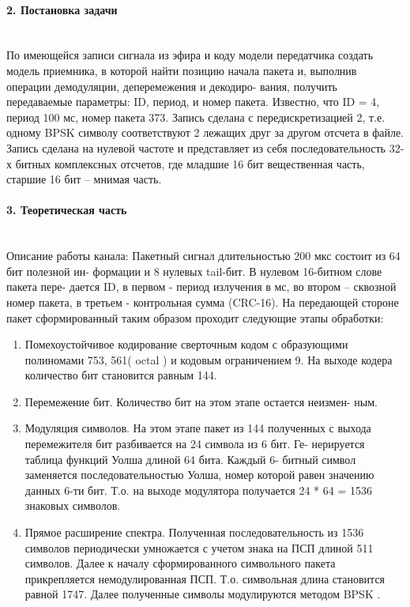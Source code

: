 \documentclass[12pt,a4paper]{report}
\begin{document}
\paragraph{2. Постановка задачи\\\\}
По имеющейся записи сигнала из эфира и коду модели передатчика создать модель приемника, в которой найти позицию начала
пакета и, выполнив операции демодуляции, деперемежения и декодиро-
вания, получить передаваемые параметры: ID, период, и номер пакета.
Известно, что ID = 4, период 100 мс, номер пакета 373. Запись сделана с передискретизацией 2, т.е. одному BPSK символу соответствуют 2 лежащих друг за другом отсчета в файле. Запись сделана на нулевой частоте и представляет из себя последовательность 32-х битных комплексных отсчетов, где младшие 16 бит вещественная часть, старшие 16 бит – мнимая часть.

\paragraph{3. Теоретическая часть \\\\}
Описание работы канала:
Пакетный сигнал длительностью 200 мкс состоит из 64 бит полезной ин-
формации и 8 нулевых tail-бит. В нулевом 16-битном слове пакета пере-
дается ID, в первом - период излучения в мс, во втором – сквозной номер пакета, в третьем - контрольная сумма (CRC-16). На передающей стороне пакет сформированный таким образом проходит следующие этапы
обработки:
\begin{enumerate}
\item Помехоустойчивое кодирование сверточным кодом с образующими
полиномами 753, 561( octal ) и кодовым ограничением 9. На выходе
кодера количество бит становится равным 144.
\item Перемежение бит. Количество бит на этом этапе остается неизмен-
ным.
\item Модуляция символов. На этом этапе пакет из 144 полученных с
выхода перемежителя бит разбивается на 24 символа из 6 бит. Ге-
нерируется таблица функций Уолша длиной 64 бита. Каждый 6-
битный символ заменяется последовательностью Уолша, номер которой равен значению данных 6-ти бит. Т.о. на выходе модулятора
получается 24 * 64 = 1536 знаковых символов.
\item Прямое расширение спектра. Полученная последовательность из
1536 символов периодически умножается с учетом знака на ПСП
длиной 511 символов. Далее к началу сформированного символьного пакета прикрепляется немодулированная ПСП. Т.о. символьная
длина становится равной 1747. Далее полученные символы модулируются методом BPSK .
\end{enumerate}
\newpage
\end{document}
